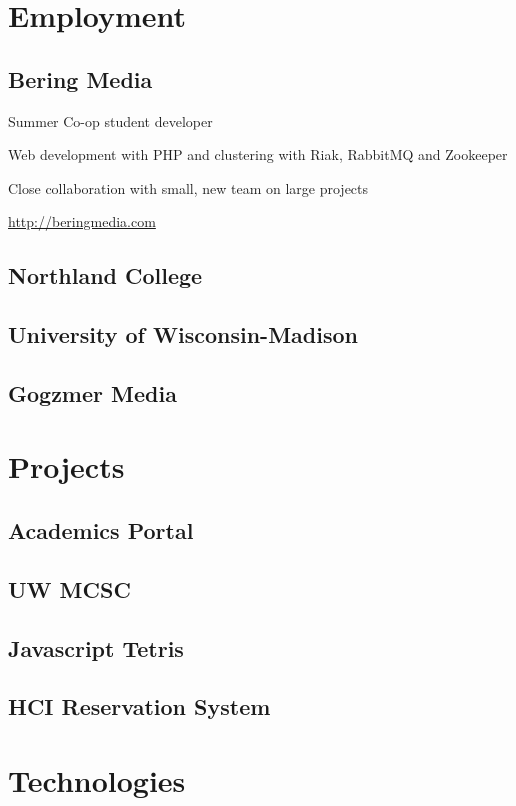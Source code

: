 \documentclass[letterpaper,11pt,notitlepage]{article}
\newenvironment{employment}
               {\begin{itemize*}%
                \setlength{\itemsep}{0cm}%
                \setlength{\parskip}{0cm}%
                \setlength{\itemindent}{-1cm}
               }
               {\end{itemize*}}
\begin{document}


\section{Employment} 
\subsection{Bering Media}
\begin{employment}
\item Summer Co-op student developer
\item Web development with PHP and clustering with Riak, RabbitMQ and
Zookeeper
\item Close collaboration with small, new team on large  projects
\item \url{http://beringmedia.com}
\end{employment}

\subsection{Northland College}
\subsection{University of Wisconsin-Madison}
\subsection{Gogzmer Media}

\section{Projects}
\subsection{Academics Portal}
\subsection{UW MCSC}
\subsection{Javascript Tetris}
\subsection{HCI Reservation System}

\section{Technologies}
\end{document}
